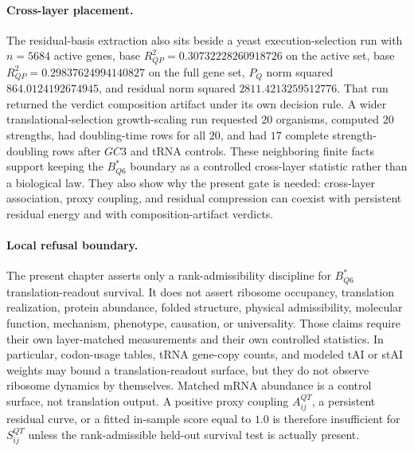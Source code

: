 \paragraph{Cross-layer placement.}
The residual-basis extraction also sits beside a yeast execution-selection run with $n=5684$ active genes, base $R^2_{QP}=0.30732228260918726$ on the active set, base $R^2_{QP}=0.29837624994140827$ on the full gene set, $P_Q$ norm squared $864.0124192674945$, and residual norm squared $2811.4213259512776$.  That run returned the verdict composition artifact under its own decision rule.  A wider translational-selection growth-scaling run requested $20$ organisms, computed $20$ strengths, had doubling-time rows for all $20$, and had $17$ complete strength-doubling rows after $GC3$ and tRNA controls.  These neighboring finite facts support keeping the $B^*_{Q6}$ boundary as a controlled cross-layer statistic rather than a biological law.  They also show why the present gate is needed: cross-layer association, proxy coupling, and residual compression can coexist with persistent residual energy and with composition-artifact verdicts.

\paragraph{Local refusal boundary.}
The present chapter asserts only a rank-admissibility discipline for $B^*_{Q6}$ translation-readout survival.  It does not assert ribosome occupancy, translation realization, protein abundance, folded structure, physical admissibility, molecular function, mechanism, phenotype, causation, or universality.  Those claims require their own layer-matched measurements and their own controlled statistics.  In particular, codon-usage tables, tRNA gene-copy counts, and modeled tAI or stAI weights may bound a translation-readout surface, but they do not observe ribosome dynamics by themselves.  Matched mRNA abundance is a control surface, not translation output.  A positive proxy coupling $A^{QT}_{ij}$, a persistent residual curve, or a fitted in-sample score equal to $1.0$ is therefore insufficient for $S^{QT}_{ij}$ unless the rank-admissible held-out survival test is actually present.